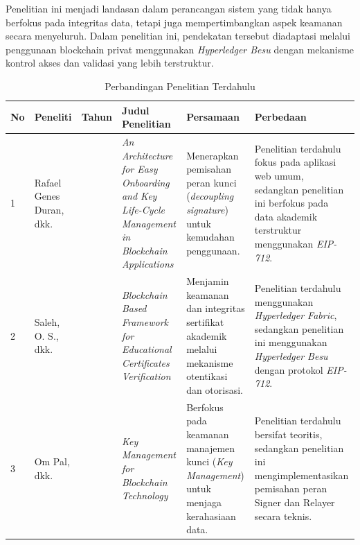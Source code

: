 		Penelitian ini menjadi landasan dalam perancangan sistem yang tidak hanya berfokus pada integritas data, tetapi juga mempertimbangkan aspek keamanan secara menyeluruh. Dalam penelitian ini, pendekatan tersebut diadaptasi melalui penggunaan blockchain privat menggunakan \textit{Hyperledger Besu} dengan mekanisme kontrol akses dan validasi yang lebih terstruktur.

		\begin{landscape}

			\renewcommand{\arraystretch}{1.3}

			\begin{longtable}{|
				>{\centering\arraybackslash}p{0.8cm}|
				>{\centering\arraybackslash}p{3.5cm}|
				>{\centering\arraybackslash}p{1.2cm}|
				p{6cm}|
				p{5cm}|
				p{5cm}|}

				\caption{Perbandingan Penelitian Terdahulu}
				\label{tab:perbandingan_penelitian} \\

				\hline
				\textbf{No} &
				\textbf{Peneliti} &
				\textbf{Tahun} &
				\textbf{Judul Penelitian} &
				\textbf{Persamaan} &
				\textbf{Perbedaan} \\ \hline
				\endfirsthead

				\hline
				\endfoot

				\hline
				\endlastfoot

				1 &
				Rafael Genes Duran, dkk. &
				2020 &
				\textit{An Architecture for Easy Onboarding and Key Life-Cycle Management in Blockchain Applications} &
				Menerapkan pemisahan peran kunci (\textit{decoupling signature}) untuk kemudahan penggunaan. &
				Penelitian terdahulu fokus pada aplikasi web umum, sedangkan penelitian ini berfokus pada data akademik terstruktur menggunakan \textit{EIP-712}. \\ \hline

				2 &
				Saleh, O. S., dkk. &
				2020 &
				\textit{Blockchain Based Framework for Educational Certificates Verification} &
				Menjamin keamanan dan integritas sertifikat akademik melalui mekanisme otentikasi dan otorisasi. &
				Penelitian terdahulu menggunakan \textit{Hyperledger Fabric}, sedangkan penelitian ini menggunakan \textit{Hyperledger Besu} dengan protokol \textit{EIP-712}. \\ \hline

				3 &
				Om Pal, dkk. &
				2021 &
				\textit{Key Management for Blockchain Technology} &
				Berfokus pada keamanan manajemen kunci (\textit{Key Management}) untuk menjaga kerahasiaan data. &
				Penelitian terdahulu bersifat teoritis, sedangkan penelitian ini mengimplementasikan pemisahan peran Signer dan Relayer secara teknis. \\ \hline


\end{longtable}
\end{landscape}

